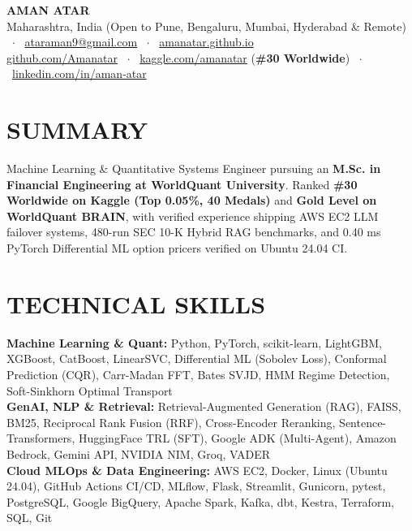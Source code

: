 \documentclass[10pt,a4paper]{article}
\begin{document}
\color{darktext}
\fontsize{8.8pt}{10.3pt}\selectfont

\begin{center}
    {\fontsize{15pt}{16.5pt}\bfseries AMAN ATAR}\\[1pt]
    \footnotesize
    Maharashtra, India (Open to Pune, Bengaluru, Mumbai, Hyderabad \& Remote) \ $\cdot$ \ 
    \href{mailto:ataraman9@gmail.com}{ataraman9@gmail.com} \ $\cdot$ \ 
    \href{https://amanatar.github.io}{amanatar.github.io}\\[0.5pt]
    \href{https://github.com/Amanatar}{github.com/Amanatar} \ $\cdot$ \ 
    \href{https://www.kaggle.com/amanatar}{kaggle.com/amanatar} (\textbf{\#30 Worldwide}) \ $\cdot$ \ 
    \href{https://www.linkedin.com/in/aman-atar}{linkedin.com/in/aman-atar}
\end{center}
\vspace{-9pt}

\section*{SUMMARY}
\noindent
Machine Learning \& Quantitative Systems Engineer pursuing an \textbf{M.Sc. in Financial Engineering at WorldQuant University}. Ranked \textbf{\#30 Worldwide on Kaggle (Top 0.05\%, 40 Medals)} and \textbf{Gold Level on WorldQuant BRAIN}, with verified experience shipping AWS EC2 LLM failover systems, 480-run SEC 10-K Hybrid RAG benchmarks, and 0.40 ms PyTorch Differential ML option pricers verified on Ubuntu 24.04 CI.

\section*{TECHNICAL SKILLS}
\noindent\textbf{Machine Learning \& Quant:} Python, PyTorch, scikit-learn, LightGBM, XGBoost, CatBoost, LinearSVC, Differential ML (Sobolev Loss), Conformal Prediction (CQR), Carr-Madan FFT, Bates SVJD, HMM Regime Detection, Soft-Sinkhorn Optimal Transport\\
\noindent\textbf{GenAI, NLP \& Retrieval:} Retrieval-Augmented Generation (RAG), FAISS, BM25, Reciprocal Rank Fusion (RRF), Cross-Encoder Reranking, Sentence-Transformers, HuggingFace TRL (SFT), Google ADK (Multi-Agent), Amazon Bedrock, Gemini API, NVIDIA NIM, Groq, VADER\\
\noindent\textbf{Cloud MLOps \& Data Engineering:} AWS EC2, Docker, Linux (Ubuntu 24.04), GitHub Actions CI/CD, MLflow, Flask, Streamlit, Gunicorn, pytest, PostgreSQL, Google BigQuery, Apache Spark, Kafka, dbt, Kestra, Terraform, SQL, Git
\end{document}
